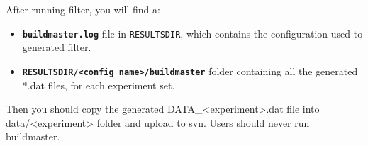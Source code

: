 After running filter, you will find a: 
\begin{itemize}
\item \texttt{\textbf{buildmaster.log}} file in \texttt{RESULTSDIR}, which contains
the configuration used to generated filter. 
\item \texttt{\textbf{RESULTSDIR/<config name>/buildmaster}} folder containing all the generated
{*}.dat files, for each experiment set. \end{itemize}
Then you should copy the generated DATA\_<experiment>.dat file into data/<experiment> folder and upload to svn. Users should never run buildmaster.

